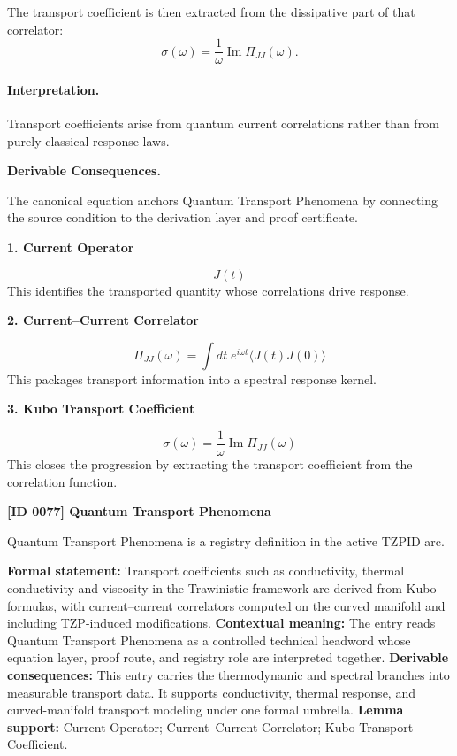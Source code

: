 The transport coefficient is then extracted from the dissipative part of that correlator:
\begin{equation}
\boxed{
\sigma(\omega)
=
\frac{1}{\omega}
\operatorname{Im}\Pi_{JJ}(\omega).
}
\end{equation}

\paragraph{Interpretation.}
Transport coefficients arise from quantum current correlations rather than from purely classical response laws.

\par\vspace{0.35em}
\noindent\textbf{Derivable Consequences.}\quad
\begingroup
\footnotesize
\raggedright
The canonical equation anchors Quantum Transport Phenomena by connecting the source condition to the derivation layer and proof certificate.
\par\endgroup

\noindent\textbf{1. Current Operator}\par
\[
J(t)
\]
\noindent This identifies the transported quantity whose correlations drive response.\par
\noindent\textbf{2. Current--Current Correlator}\par
\[
\Pi_{JJ}(\omega)
=
\int dt\; e^{i\omega t}\langle J(t)J(0)\rangle
\]
\noindent This packages transport information into a spectral response kernel.\par
\noindent\textbf{3. Kubo Transport Coefficient}\par
\[
\sigma(\omega)
=
\frac{1}{\omega}\operatorname{Im}\Pi_{JJ}(\omega)
\]
\noindent This closes the progression by extracting the transport coefficient from the correlation function.\par

\clearpage
\noindent\textbf{[ID 0077] Quantum Transport Phenomena}\par
\vspace{0.35em}
\begingroup\small
{}
Quantum Transport Phenomena is a registry definition in the active TZPID arc.

\begingroup\footnotesize\setlength{\emergencystretch}{3em}\sloppy
\textbf{Formal statement:} Transport coefficients such as conductivity, thermal conductivity and viscosity in the Trawinistic framework are derived from Kubo formulas, with current--current correlators computed on the curved manifold and including TZP-induced modifications. \textbf{Contextual meaning:} The entry reads Quantum Transport Phenomena as a controlled technical headword whose equation layer, proof route, and registry role are interpreted together. \textbf{Derivable consequences:} This entry carries the thermodynamic and spectral branches into measurable transport data. It supports conductivity, thermal response, and curved-manifold transport modeling under one formal umbrella. \textbf{Lemma support:} Current Operator; Current--Current Correlator; Kubo Transport Coefficient.\par
\endgroup

